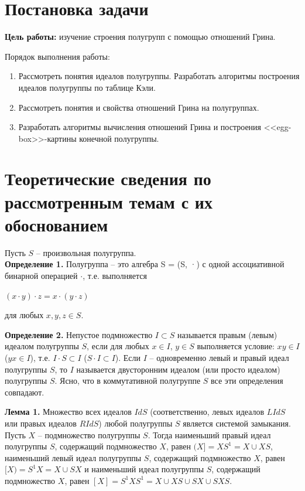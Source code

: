 \documentclass[spec, och, labwork]{shiza}
\begin{document}
\tableofcontents

\section{Постановка задачи}

  \textbf{Цель работы:} изучение строения полугрупп с помощью отношений Грина.
  
  Порядок выполнения работы:
    \begin{enumerate}
        \item Рассмотреть понятия идеалов полугруппы. Разработать алгоритмы построения идеалов полугруппы по таблице Кэли.
        \item Рассмотреть понятия и свойства отношений Грина на полугруппах.
        \item Разработать алгоритмы вычисления отношений Грина и построения <<egg-box>>-картины конечной полугруппы.
    \end{enumerate}

\section{Теоретические сведения по рассмотренным темам с их обоснованием}

  Пусть $S$ -- произвольная полугруппа.\\
  \textbf{Определение 1.} Полугруппа – это алгебра S = (S, ·) с одной ассоциативной бинарной
    операцией $\cdot$, т.е. выполняется
      \begin{center}
        $(x \cdot y) \cdot z = x \cdot (y \cdot z)$
      \end{center}
    для любых $x,y,z \in S$.
    
    \textbf{Определение 2.} Непустое подмножество $I \subset S$ называется правым (левым) идеалом полугруппы $S$,
    если для любых $x \in I$, $y \in S$ выполняется условие: $xy \in I$ ($yx \in I$), т.е. $I \cdot S \subset I$ ($S \cdot I \subset I$).
    Если $I$ -- одновременно левый и правый идеал полугруппы $S$, то $I$ называется двусторонним идеалом (или просто идеалом) полугруппы
    $S$. Ясно, что в коммутативной полугруппе $S$ все эти определения совпадают.

    \textbf{Лемма 1.} Множество всех идеалов $Id S$  (соответственно, левых идеалов $LId S$  или правых идеалов $RId S$) любой
    полугруппы $S$ является системой замыкания. Пусть $X$ -- подмножество полугруппы $S$. Тогда наименьший правый идеал 
    полугруппы $S$, содержащий подмножество $X$, равен $(X] = XS^1 = X \cup XS$, наименьший левый идеал полугруппы $S$, содержащий
    подмножество $X$, равен $[X) = S^1X = X \cup SX$  и наименьший идеал полугруппы $S$, содержащий подмножество $X$, равен 
    $[X] = S^1XS^1 = X \cup XS \cup SX \cup SXS$.
    
\end{document}
